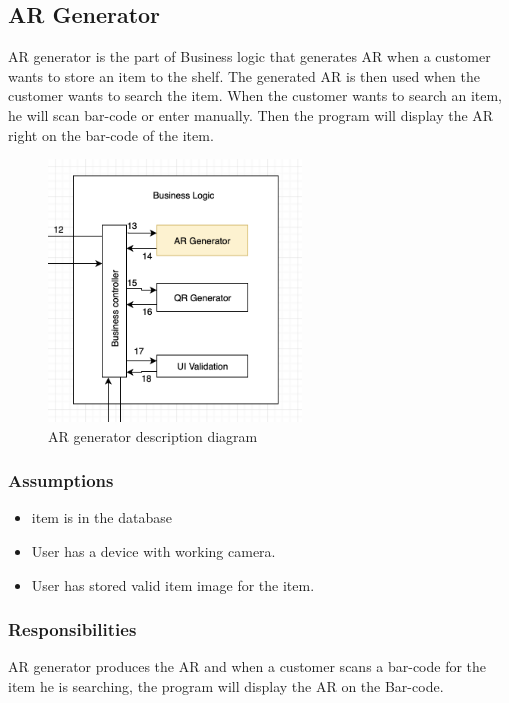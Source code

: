 \subsection{AR Generator}
AR generator is the part of Business logic that generates AR when a customer wants to store an item to the shelf. The generated AR is then used when the customer wants to search the item. When the customer wants to search an item, he will scan bar-code or enter manually. Then the program will display the AR right on the bar-code of the item. 

\begin{figure}[h!]
	\centering
 	\includegraphics[width=0.60\textwidth]{images/argenerator}
 \caption{AR generator description diagram}
\end{figure}

\subsubsection{Assumptions}
\begin{itemize}
    \item item is in the database
    \item User has a device with working camera.
    \item User has stored valid item image for the item.
\end{itemize}

\subsubsection{Responsibilities}
AR generator produces the AR and when a customer scans a bar-code for the item he is searching, the program will display the AR on the Bar-code.

